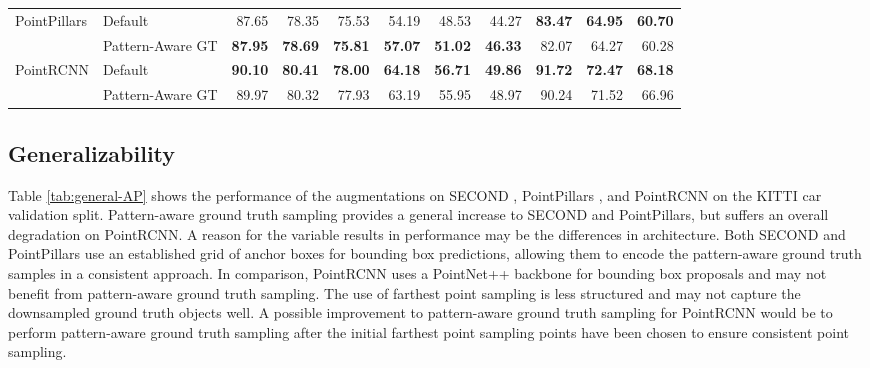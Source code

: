 \documentclass[10pt, conference, compsocconf]{IEEEtran}
\begin{document}
\begin{table*}[]
\begin{tabular}{l|l|rrr|rrr|rrr}
PointPillars                                & Default                                             & 87.65                    & 78.35                        & 75.53                     & 54.19                    & 48.53                        & 44.27                     & \textbf{83.47}           & \textbf{64.95}               & \textbf{60.70}           \\
                                            & Pattern-Aware GT                                    & \textbf{87.95}           & \textbf{78.69}               & \textbf{75.81}            & \textbf{57.07}           & \textbf{51.02}               & \textbf{46.33}            & 82.07                    & 64.27                        & 60.28                    \\ \hline
PointRCNN                                   & Default                                             & \textbf{90.10}           & \textbf{80.41}               & \textbf{78.00}            & \textbf{64.18}           & \textbf{56.71}               & \textbf{49.86}            & \textbf{91.72}           & \textbf{72.47}               & \textbf{68.18}           \\
                                            & Pattern-Aware GT                                    & 89.97                    & 80.32                        & 77.93                     & 63.19                    & 55.95                        & 48.97                     & 90.24                    & 71.52                        & 66.96                    \\ \hline
\end{tabular}
\end{table*}

\subsection{Generalizability}
Table \ref{tab:general-AP} shows the performance of the augmentations on SECOND \cite{Yan2018}, PointPillars \cite{Lang2019}, and PointRCNN \cite{Shi2019} on the KITTI car validation split. Pattern-aware ground truth sampling provides a general increase to SECOND and PointPillars, but suffers an overall degradation on PointRCNN. A reason for the variable results in performance may be the differences in architecture. Both SECOND and PointPillars use an established grid of anchor boxes for bounding box predictions, allowing them to encode the pattern-aware ground truth samples in a consistent approach. In comparison, PointRCNN uses a PointNet++ backbone for bounding box proposals and may not benefit from pattern-aware ground truth sampling. The use of farthest point sampling is less structured and may not capture the downsampled ground truth objects well. A possible improvement to pattern-aware ground truth sampling for PointRCNN would be to perform pattern-aware ground truth sampling after the initial farthest point sampling points have been chosen to ensure consistent point sampling.
\end{document}

